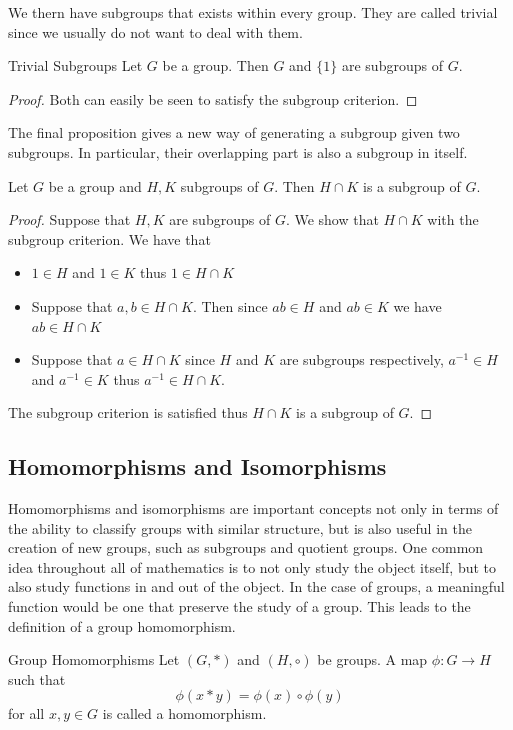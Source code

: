\documentclass[a4paper]{article}
\begin{document}
We thern have subgroups that exists within every group. They are called trivial since we usually do not want to deal with them. 

\begin{lmm}{Trivial Subgroups}{} Let $G$ be a group. Then $G$ and $\{1\}$ are subgroups of $G$. 
\begin{proof} Both can easily be seen to satisfy the subgroup criterion. 
\end{proof}
\end{lmm}

The final proposition gives a new way of generating a subgroup given two subgroups. In particular, their overlapping part is also a subgroup in itself. 

\begin{prp}{}{} Let $G$ be a group and $H,K$ subgroups of $G$. Then $H\cap K$ is a subgroup of $G$. 
\begin{proof} Suppose that $H,K$ are subgroups of $G$. We show that $H\cap K$ with the subgroup criterion. We have that 
\begin{itemize}
\item $1\in H$ and $1\in K$ thus $1\in H\cap K$
\item Suppose that $a,b\in H\cap K$. Then since $ab\in H$ and $ab\in K$ we have $ab\in H\cap K$
\item Suppose that $a\in H\cap K$ since $H$ and $K$ are subgroups respectively, $a^{-1}\in H$ and $a^{-1}\in K$ thus $a^{-1}\in H\cap K$. 
\end{itemize}
The subgroup criterion is satisfied thus $H\cap K$ is a subgroup of $G$. 
\end{proof}
\end{prp}

\subsection{Homomorphisms and Isomorphisms}
Homomorphisms and isomorphisms are important concepts not only in terms of the ability to classify groups with similar structure, but is also useful in the creation of new groups, such as subgroups and quotient groups. One common idea throughout all of mathematics is to not only study the object itself, but to also study functions in and out of the object. In the case of groups, a meaningful function would be one that preserve the study of a group. This leads to the definition of a group homomorphism. 

\begin{defn}{Group Homomorphisms}{} Let $(G,*)$ and $(H,\circ)$ be groups. A map $\phi:G\to H$ such that $$\phi(x*y)=\phi(x)\circ\phi(y)$$ for all $x,y\in G$ is called a homomorphism. 
\end{defn}
\end{document}

